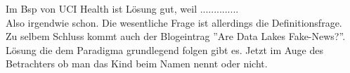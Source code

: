 \documentclass[twoside,twocolumn]{article}
\begin{document}
Im Bsp von UCI Health ist Lösung gut, weil ..............\cite{s2}\\

Also irgendwie schon. Die wesentliche Frage ist allerdings die Definitionsfrage.\\
Zu selbem Schluss kommt auch der Blogeintrag ''Are Data Lakes Fake-News?''. Lösung die dem Paradigma grundlegend folgen gibt es. Jetzt im Auge des Betrachters ob man das Kind beim Namen nennt oder nicht.










\end{document}
